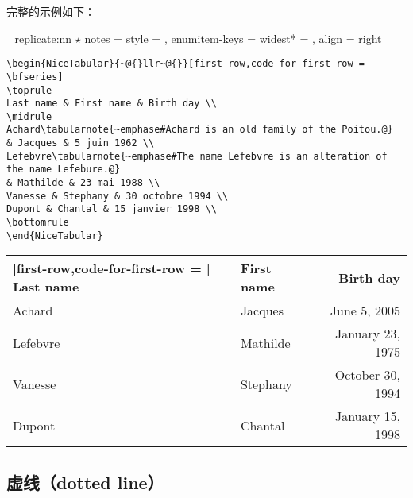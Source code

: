\documentclass[dvipsnames]{article}%
\begin{document}
完整的示例如下：

\begin{scope}
\ExplSyntaxOn
\NewDocumentCommand {}
 { \prg_replicate:nn { \value { #1 } } { $ \star $ } } 
\NiceMatrixOptions 
 {
   notes = 
    {
      style =  ,
      enumitem-keys = 
       {
         widest* = \value{tabularnote} ,
         align = right 
       }
    }
 }
\ExplSyntaxOff
\begin{Verbatim}
\begin{NiceTabular}{~@{}llr~@{}}[first-row,code-for-first-row = \bfseries]
\toprule
Last name & First name & Birth day \\
\midrule
Achard\tabularnote{~emphase#Achard is an old family of the Poitou.@} 
& Jacques & 5 juin 1962 \\
Lefebvre\tabularnote{~emphase#The name Lefebvre is an alteration of the name Lefebure.@} 
& Mathilde & 23 mai 1988 \\
Vanesse & Stephany & 30 octobre 1994 \\
Dupont & Chantal & 15 janvier 1998 \\
\bottomrule
\end{NiceTabular}
\end{Verbatim}

\begin{center}
\begin{NiceTabular}{@{}llr@{}}[first-row,code-for-first-row = \bfseries]
\toprule
Last name & First name & Birth day \\
\midrule
Achard 
& Jacques & June 5, 2005 \\
Lefebvre 
& Mathilde & January 23, 1975 \\
Vanesse & Stephany & October 30, 1994 \\
Dupont & Chantal & January 15, 1998 \\
\bottomrule
\end{NiceTabular}
\end{center}
\end{scope}


\subsection{虚线（dotted line）}
\end{document}
